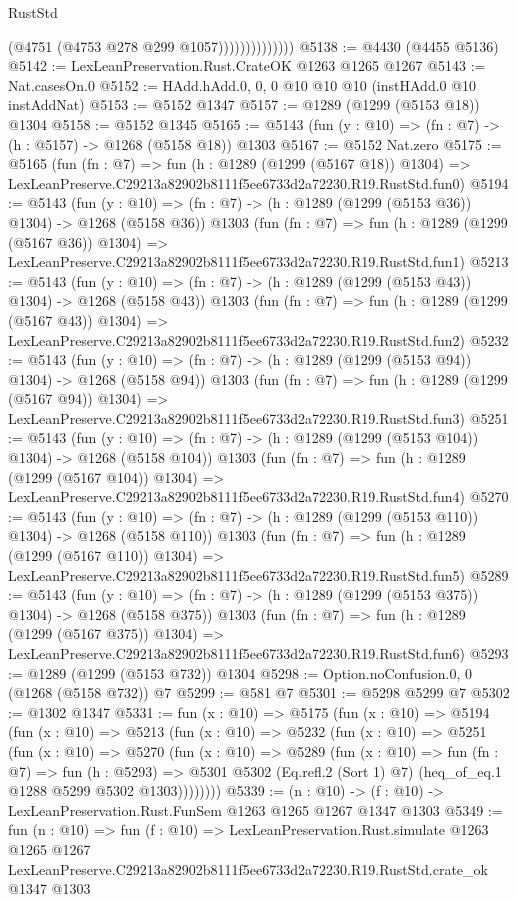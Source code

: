 \begin{lexlean}{RustStd}
\begin{coremodule}
                            (@4751 (@4753 @278 @299 @1057))))))))))))))
@5138 := @4430 (@4455 @5136)
@5142 := LexLeanPreservation.Rust.CrateOK @1263 @1265 @1267
@5143 := Nat.casesOn.{0}
@5152 := HAdd.hAdd.{0, 0, 0} @10 @10 @10 (instHAdd.{0} @10 instAddNat)
@5153 := @5152 @1347
@5157 := @1289 (@1299 (@5153 @18)) @1304
@5158 := @5152 @1345
@5165 := @5143 (fun (y : @10) => (fn : @7) -> (h : @5157) -> @1268 (@5158 @18)) @1303
@5167 := @5152 Nat.zero
@5175 := @5165
    (fun (fn : @7) =>
    fun (h : @1289 (@1299 (@5167 @18)) @1304) =>
    LexLeanPreserve.C29213a82902b8111f5ee6733d2a72230.R19.RustStd.fun0)
@5194 := @5143
    (fun (y : @10) => (fn : @7) -> (h : @1289 (@1299 (@5153 @36)) @1304) -> @1268 (@5158 @36))
    @1303
    (fun (fn : @7) =>
    fun (h : @1289 (@1299 (@5167 @36)) @1304) =>
    LexLeanPreserve.C29213a82902b8111f5ee6733d2a72230.R19.RustStd.fun1)
@5213 := @5143
    (fun (y : @10) => (fn : @7) -> (h : @1289 (@1299 (@5153 @43)) @1304) -> @1268 (@5158 @43))
    @1303
    (fun (fn : @7) =>
    fun (h : @1289 (@1299 (@5167 @43)) @1304) =>
    LexLeanPreserve.C29213a82902b8111f5ee6733d2a72230.R19.RustStd.fun2)
@5232 := @5143
    (fun (y : @10) => (fn : @7) -> (h : @1289 (@1299 (@5153 @94)) @1304) -> @1268 (@5158 @94))
    @1303
    (fun (fn : @7) =>
    fun (h : @1289 (@1299 (@5167 @94)) @1304) =>
    LexLeanPreserve.C29213a82902b8111f5ee6733d2a72230.R19.RustStd.fun3)
@5251 := @5143
    (fun (y : @10) => (fn : @7) -> (h : @1289 (@1299 (@5153 @104)) @1304) -> @1268 (@5158 @104))
    @1303
    (fun (fn : @7) =>
    fun (h : @1289 (@1299 (@5167 @104)) @1304) =>
    LexLeanPreserve.C29213a82902b8111f5ee6733d2a72230.R19.RustStd.fun4)
@5270 := @5143
    (fun (y : @10) => (fn : @7) -> (h : @1289 (@1299 (@5153 @110)) @1304) -> @1268 (@5158 @110))
    @1303
    (fun (fn : @7) =>
    fun (h : @1289 (@1299 (@5167 @110)) @1304) =>
    LexLeanPreserve.C29213a82902b8111f5ee6733d2a72230.R19.RustStd.fun5)
@5289 := @5143
    (fun (y : @10) => (fn : @7) -> (h : @1289 (@1299 (@5153 @375)) @1304) -> @1268 (@5158 @375))
    @1303
    (fun (fn : @7) =>
    fun (h : @1289 (@1299 (@5167 @375)) @1304) =>
    LexLeanPreserve.C29213a82902b8111f5ee6733d2a72230.R19.RustStd.fun6)
@5293 := @1289 (@1299 (@5153 @732)) @1304
@5298 := Option.noConfusion.{0, 0} (@1268 (@5158 @732)) @7
@5299 := @581 @7
@5301 := @5298 @5299 @7
@5302 := @1302 @1347
@5331 := fun (x : @10) =>
  @5175
    (fun (x : @10) =>
    @5194
      (fun (x : @10) =>
      @5213
        (fun (x : @10) =>
        @5232
          (fun (x : @10) =>
          @5251
            (fun (x : @10) =>
            @5270
              (fun (x : @10) =>
              @5289
                (fun (x : @10) =>
                fun (fn : @7) =>
                fun (h : @5293) =>
                @5301 @5302 (Eq.refl.{2} (Sort 1) @7) (heq_of_eq.{1} @1288 @5299 @5302 @1303))))))))
@5339 := (n : @10) -> (f : @10) -> LexLeanPreservation.Rust.FunSem @1263 @1265 @1267 @1347 @1303
@5349 := fun (n : @10) =>
  fun (f : @10) =>
  LexLeanPreservation.Rust.simulate
    @1263
    @1265
    @1267
    LexLeanPreserve.C29213a82902b8111f5ee6733d2a72230.R19.RustStd.crate_ok
    @1347
    @1303
\end{coremodule}
\end{lexlean}
